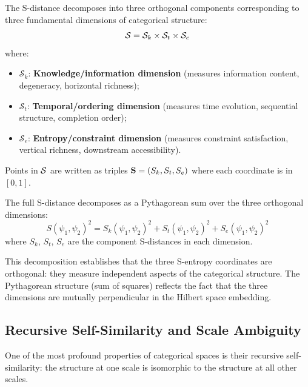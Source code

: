 \begin{definition}
\label{def:s_space_formal}
The S-distance decomposes into three orthogonal components corresponding to three fundamental dimensions of categorical structure:
\begin{equation}
\mathcal{S} = \mathcal{S}_k \times \mathcal{S}_t \times \mathcal{S}_e
\label{eq:s_space_decomposition}
\end{equation}
where:
\begin{itemize}
    \item $\mathcal{S}_k$: \textbf{Knowledge/information dimension} (measures information content, degeneracy, horizontal richness);
    \item $\mathcal{S}_t$: \textbf{Temporal/ordering dimension} (measures time evolution, sequential structure, completion order);
    \item $\mathcal{S}_e$: \textbf{Entropy/constraint dimension} (measures constraint satisfaction, vertical richness, downstream accessibility).
\end{itemize}

Points in $\mathcal{S}$ are written as triples $\mathbf{S} = (S_k, S_t, S_e)$ where each coordinate is in $[0,1]$.
\end{definition}

\begin{definition}
\label{def:s_decomposition_formal}
The full S-distance decomposes as a Pythagorean sum over the three orthogonal dimensions:
\begin{equation}
S(\psi_1, \psi_2)^2 = S_k(\psi_1, \psi_2)^2 + S_t(\psi_1, \psi_2)^2 + S_e(\psi_1, \psi_2)^2
\label{eq:s_distance_decomposition}
\end{equation}
where $S_k$, $S_t$, $S_e$ are the component S-distances in each dimension.
\end{definition}

This decomposition establishes that the three S-entropy coordinates are orthogonal: they measure independent aspects of the categorical structure. The Pythagorean structure (sum of squares) reflects the fact that the three dimensions are mutually perpendicular in the Hilbert space embedding.

\subsection{Recursive Self-Similarity and Scale Ambiguity}

One of the most profound properties of categorical spaces is their recursive self-similarity: the structure at one scale is isomorphic to the structure at all other scales.

